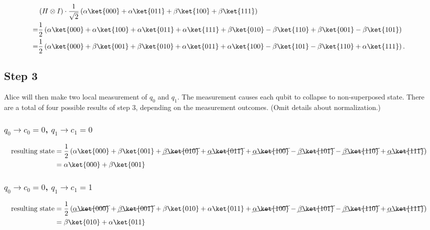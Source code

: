 \documentclass[10pt,a4paper]{article}
\newcommand{\<}{\langle}
\renewcommand{\>}{\rangle}
\newcommand{\prths}[1]{\left( #1 \right)}
\begin{document}
\begin{align*}
& \prths{H \otimes I } \cdot
\frac{1}{\sqrt{2}}
\prths {
\alpha \ket{000}+
\alpha \ket{011}+
\beta \ket{100}+
\beta \ket{111}
} \\ = &
\frac{1}{2}
\prths {
 \alpha \ket{000}
+\alpha \ket{100}
+\alpha \ket{011}
+\alpha \ket{111}
+\beta  \ket{010}
-\beta  \ket{110}
+\beta  \ket{001}
-\beta  \ket{101}
} \\ = &
\frac{1}{2}
\prths {
 \alpha \ket{000}
+\beta  \ket{001}
+\beta  \ket{010}
+\alpha \ket{011}
+\alpha \ket{100}
-\beta  \ket{101}
-\beta  \ket{110}
+\alpha \ket{111}
}.
\end{align*}

\subsection{Step 3}
Alice will then make two local measurement of $q_0$ and $q_1$. The measurement causes each qubit to
collapse to non-superposed state. There are a total of four possible results of step 3, depending
on the measurement outcomes. (Omit details about normalization.)

\subsubsection{ $q_0 \rightarrow c_0 = 0$, $q_1 \rightarrow c_1 = 0$}
\begin{align*}
\textrm{resulting state}
& =
\frac{1}{2}
\prths {
 \alpha \ket{000}
+\beta  \ket{001}
+\cancel{\beta  \ket{010}}
+\cancel{\alpha \ket{011}}
+\cancel{\alpha \ket{100}}
-\cancel{\beta  \ket{101}}
-\cancel{\beta  \ket{110}}
+\cancel{\alpha \ket{111}}
}
\\ & =
 \alpha \ket{000}
+\beta  \ket{001}
\end{align*}

\subsubsection{ $q_0 \rightarrow c_0 = 0$, $q_1 \rightarrow c_1 = 1$}
\begin{align*}
\textrm{resulting state}
& =
\frac{1}{2}
\prths {
\cancel{\alpha \ket{000}}
+\cancel{\beta  \ket{001}}
+\beta  \ket{010}
+\alpha \ket{011}
+\cancel{\alpha \ket{100}}
-\cancel{\beta  \ket{101}}
-\cancel{\beta  \ket{110}}
+\cancel{\alpha \ket{111}}
}
\\ & =
 \beta  \ket{010}
+\alpha \ket{011}
\end{align*}
\end{document}
